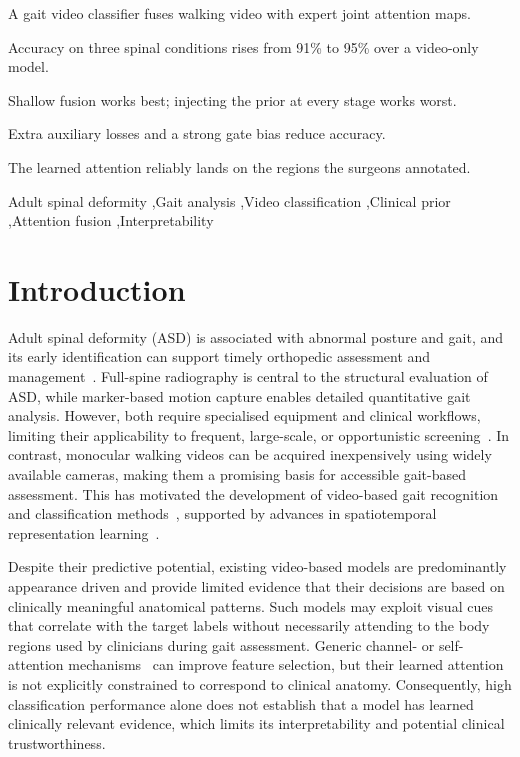 \documentclass[review,authoryear,times]{elsarticle}
\begin{document}
\begin{frontmatter}
\begin{highlights}
\item A gait video classifier fuses walking video with expert joint attention maps.
\item Accuracy on three spinal conditions rises from 91\% to 95\% over a video-only model.
\item Shallow fusion works best; injecting the prior at every stage works worst.
\item Extra auxiliary losses and a strong gate bias reduce accuracy.
\item The learned attention reliably lands on the regions the surgeons annotated.
\end{highlights}

\begin{keyword}
Adult spinal deformity \sep Gait analysis \sep Video classification \sep Clinical prior \sep Attention fusion \sep Interpretability
\end{keyword}

\end{frontmatter}

\section{Introduction}
\label{sec:intro}

Adult spinal deformity (ASD) is associated with abnormal posture and gait, and its early identification can support timely orthopedic assessment and management~\citep{asd_clinical_review}. Full-spine radiography is central to the structural evaluation of ASD, while marker-based motion capture enables detailed quantitative gait analysis. However, both require specialised equipment and clinical workflows, limiting their applicability to frequent, large-scale, or opportunistic screening~\citep{motioncapture_gait}. In contrast, monocular walking videos can be acquired inexpensively using widely available cameras, making them a promising basis for accessible gait-based assessment. This has motivated the development of video-based gait recognition and classification methods~\citep{clinical_gait_review,chao2019gaitset}, supported by advances in spatiotemporal representation learning~\citep{feichtenhofer2019slowfast}.

Despite their predictive potential, existing video-based models are predominantly appearance driven and provide limited evidence that their decisions are based on clinically meaningful anatomical patterns. Such models may exploit visual cues that correlate with the target labels without necessarily attending to the body regions used by clinicians during gait assessment. Generic channel- or self-attention mechanisms~\citep{hu2018senet,vaswani2017attention} can improve feature selection, but their learned attention is not explicitly constrained to correspond to clinical anatomy. Consequently, high classification performance alone does not establish that a model has learned clinically relevant evidence, which limits its interpretability and potential clinical trustworthiness.
\end{document}
